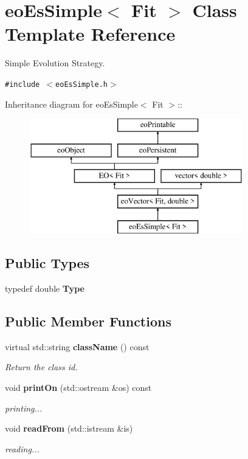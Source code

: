 \section{eo\-Es\-Simple$<$ Fit $>$ Class Template Reference}
\label{classeo_es_simple}
Simple Evolution Strategy.  


{\tt \#include $<$eo\-Es\-Simple.h$>$}

Inheritance diagram for eo\-Es\-Simple$<$ Fit $>$::\begin{figure}[H]
\begin{center}
\leavevmode
\includegraphics[height=5cm]{classeo_es_simple}
\end{center}
\end{figure}
\subsection*{Public Types}
\begin{CompactItemize}
\item 
typedef double {\bf Type}\label{classeo_es_simple_w0}

\end{CompactItemize}
\subsection*{Public Member Functions}
\begin{CompactItemize}
\item 
virtual std::string {\bf class\-Name} () const 
\begin{CompactList}\small\item\em Return the class id. \item\end{CompactList}\item 
void {\bf print\-On} (std::ostream \&os) const \label{classeo_es_simple_a2}

\begin{CompactList}\small\item\em printing... \item\end{CompactList}\item 
void {\bf read\-From} (std::istream \&is)\label{classeo_es_simple_a3}

\begin{CompactList}\small\item\em reading... \item\end{CompactList}\end{CompactItemize}

